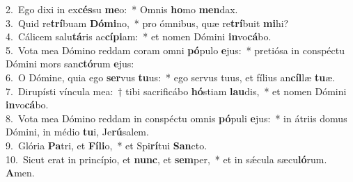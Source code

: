 {2.~}Ego dixi in ex\textbf{cés}su \textbf{me}o:~* Omnis \textbf{ho}mo \textbf{men}dax.\\
{3.~}Quid re\textbf{trí}buam \textbf{Dó}\textbf{mi}no,~* pro ómnibus, quæ re\textbf{trí}buit \textbf{mi}hi?\\
{4.~}Cálicem salu\textbf{tá}ris ac\textbf{cí}\textbf{pi}am:~* et nomen Dómini \textbf{in}vo\textbf{cá}bo.\\
{5.~}Vota mea Dómino reddam coram omni \textbf{pó}pulo \textbf{e}jus:~* pretiósa in conspéctu Dómini mors san\textbf{ctó}rum \textbf{e}jus:\\
{6.~}O Dómine, quia ego \textbf{ser}vus \textbf{tu}us:~* ego servus tuus, et fílius an\textbf{cíl}læ \textbf{tu}æ.\\
{7.~}Dirupísti víncula mea:~† tibi sacrificábo \textbf{hó}stiam \textbf{lau}dis,~* et nomen Dómini \textbf{in}vo\textbf{cá}bo.\\
{8.~}Vota mea Dómino reddam in conspéctu omnis \textbf{pó}puli \textbf{e}jus:~* in átriis domus Dómini, in médio \textbf{tu}i, Je\textbf{rú}salem.\\
{9.~}Glória \textbf{Pa}tri, et \textbf{Fí}\textbf{li}o,~* et Spi\textbf{rí}tui \textbf{San}cto.\\
{10.~}Sicut erat in princípio, et \textbf{nunc}, et \textbf{sem}per,~* et in sǽcula sæcu\textbf{ló}rum. \textbf{A}men.\\
